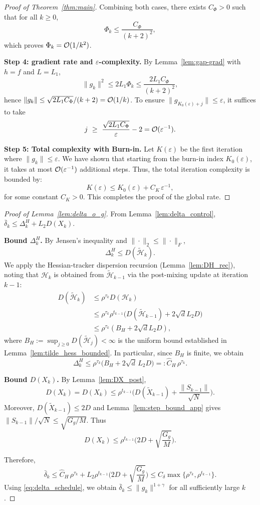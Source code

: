 \documentclass[review,onefignum,onetabnum]{siamart171218}
\begin{document}
\begin{proof}[Proof of Theorem~\ref{thm:main}]
Combining both cases, there exists $C_\Phi>0$ such that for all $k\ge 0$,
\[
\Phi_k\le \frac{C_\Phi}{(k+2)^2},
\]
which proves $\Phi_k=\mathcal{O}(1/k^2)$.

\smallskip
\noindent\textbf{Step 4: gradient rate and $\varepsilon$-complexity.}
By Lemma~\ref{lem:gap-grad} with $h=f$ and $L=L_1$,
\[
\|g_k\|^2\le 2L_1\Phi_k\le \frac{2L_1 C_\Phi}{(k+2)^2},
\]
hence $\|g_k\|\le \sqrt{2L_1 C_\Phi}/(k+2)=\mathcal{O}(1/k)$.
To ensure $\|g_{K_0(\varepsilon)+j}\|\le \varepsilon$, it suffices to take
\[
j\ \ge\ \frac{\sqrt{2L_1 C_\Phi}}{\varepsilon}-2
=\cO(\varepsilon^{-1}).
\]

\smallskip
\noindent\textbf{Step 5: Total complexity with Burn-in.}
Let $K(\varepsilon)$ be the first iteration where $\|g_k\|\le \varepsilon$. We have shown that starting from the burn-in index $K_0(\varepsilon)$, it takes at most $\mathcal{O}(\varepsilon^{-1})$ additional steps. Thus, the total iteration complexity is bounded by:
\[
K(\varepsilon)\le K_0(\varepsilon)+C_K\,\varepsilon^{-1},
\]
for some constant $C_K>0$. This completes the proof of the global rate.
\end{proof}

\begin{proof}[Proof of Lemma~\ref{lem:delta_o_g}]
From Lemma~\ref{lem:delta_control}, $\bar\delta_k\le \Delta_k^H+L_2D(X_k)$.

\smallskip
\noindent\textbf{Bound $\Delta_k^H$.}
By Jensen's inequality and $\|\cdot\|_2\le \|\cdot\|_F$,
\[
\Delta_k^H\le D(\tilde{\mathcal H}_k).
\]
We apply the Hessian-tracker dispersion recursion (Lemma~\ref{lem:DH_rec}),
noting that $\mathcal H_k$ is obtained from $\tilde{\mathcal H}_{k-1}$
via the post-mixing update at iteration $k{-}1$:
\begin{align*}
D(\tilde{\mathcal H}_k)
&\le \rho^{\tau_k}D(\mathcal H_k)\\
&\le \rho^{\tau_k}\rho^{t_{k-1}}\bigl(D(\tilde{\mathcal H}_{k-1})
\!+\!2\sqrt{d}L_2D\bigr)\\
&\le \rho^{\tau_k}(B_H\!+\!2\sqrt{d}L_2D),
\end{align*}
where $B_H:=\sup_{j\ge 0}D(\tilde{\mathcal H}_j)<\infty$ is the uniform bound
established in Lemma~\ref{lem:tilde_hess_bounded}.
In particular, since $B_H$ is finite, we obtain
\[
\Delta_k^H\le \rho^{\tau_k}\big(B_H+2\sqrt{d}\,L_2D\big)
=:\hat C_H\,\rho^{\tau_k}.
\]

\smallskip
\noindent\textbf{Bound $D(X_k)$.}
By Lemma~\ref{lem:DX_post},
\[
D(X_k)=D(X_k)\le \rho^{t_{k-1}}\Big(D(\tilde X_{k-1})+\frac{\|S_{k-1}\|}{\sqrt N}\Big).
\]
Moreover, $D(\tilde X_{k-1})\le 2D$ and Lemma~\ref{lem:step_bound_app} gives $\|S_{k-1}\|/\sqrt N\le \sqrt{G_g/M}$.
Thus
\[
D(X_k)\le \rho^{t_{k-1}}\Big(2D+\sqrt{\frac{G_g}{M}}\Big).
\]

\smallskip
Therefore,
\[
\bar\delta_k\le \hat C_H\,\rho^{\tau_k}
+L_2\rho^{t_{k-1}}\Big(2D+\sqrt{\frac{G_g}{M}}\Big)
\le C_\delta\max\{\rho^{\tau_k},\rho^{t_{k-1}}\}.
\]
Using \eqref{eq:delta_schedule}, we obtain $\bar\delta_k\le \|g_k\|^{1+\gamma}$ for all sufficiently large $k$.
\end{proof}
\end{document}

